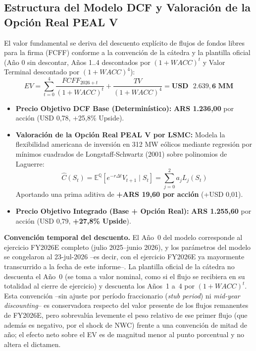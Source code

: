 \documentclass[10pt,a4paper]{article}
\begin{document}
\subsection{Estructura del Modelo DCF y Valoración de la Opción Real PEAL V}
El valor fundamental se deriva del descuento explícito de flujos de fondos libres para la firma (FCFF) conforme a la convención de la cátedra y la plantilla oficial (Año 0 sin descontar, Años 1..4 descontados por $(1+WACC)^t$ y Valor Terminal descontado por $(1+WACC)^4$):
\begin{equation}
    EV = \sum_{t=0}^{4} \frac{FCFF_{2026+t}}{(1 + WACC)^t} + \frac{TV}{(1 + WACC)^4} = \mathbf{USD\text{ }2.639,6\text{ MM}}
\end{equation}
\begin{itemize}
    \item \textbf{Precio Objetivo DCF Base (Determinístico):} \textbf{ARS 1.236,00} por acción (USD 0,78, +25,8\% Upside).
    \item \textbf{Valoración de la Opción Real PEAL V por LSMC:} Modela la flexibilidad americana de inversión en 312 MW eólicos mediante regresión por mínimos cuadrados de Longstaff-Schwartz (2001) sobre polinomios de Laguerre:
    \begin{equation}
        \hat{C}(S_t) = \mathbb{E}^{\mathbb{Q}}\left[ e^{-r \Delta t} V_{t+1} \mid S_t \right] = \sum_{j=0}^{2} a_j L_j(S_t)
    \end{equation}
    Aportando una prima aditiva de \textbf{+ARS 19,60 por acción} (+USD 0,01).
    \item \textbf{Precio Objetivo Integrado (Base + Opción Real):} \textbf{ARS 1.255,60} por acción (USD 0,79, \textbf{+27,8\% Upside}).
\end{itemize}

\textbf{Convención temporal del descuento.} El Año~0 del modelo corresponde al ejercicio FY2026E completo (julio 2025--junio 2026), y los parámetros del modelo se congelaron al 23-jul-2026 --es decir, con el ejercicio FY2026E ya mayormente transcurrido a la fecha de este informe--. La plantilla oficial de la cátedra no descuenta el Año~0 (se toma a valor nominal, como si el flujo se recibiera en su totalidad al cierre de ejercicio) y descuenta los Años~1 a~4 por $(1+WACC)^t$. Esta convención --sin ajuste por período fraccionario (\textit{stub period}) ni \textit{mid-year discounting}-- es conservadora respecto del valor presente de los flujos remanentes de FY2026E, pero sobrevalúa levemente el peso relativo de ese primer flujo (que además es negativo, por el shock de NWC) frente a una convención de mitad de año; el efecto neto sobre el EV es de magnitud menor al punto porcentual y no altera el dictamen.
\end{document}
